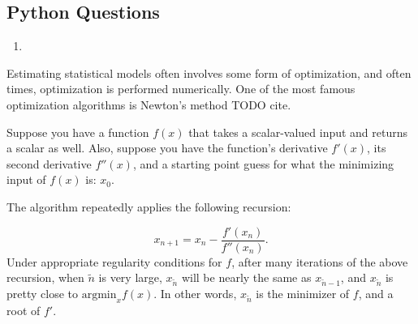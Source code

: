 \documentclass[
  12pt,
  krantz2]{krantz}
\providecommand{\tightlist}{%
  \setlength{\itemsep}{0pt}\setlength{\parskip}{0pt}}
\begin{document}
\hypertarget{python-questions-4}{%
\subsection{Python Questions}\label{python-questions-4}}

\begin{enumerate}
\def\labelenumi{\arabic{enumi}.}
\tightlist
\item
\end{enumerate}

Estimating statistical models often involves some form of optimization, and often times, optimization is performed numerically. One of the most famous optimization algorithms is Newton's method TODO cite.

Suppose you have a function \(f(x)\) that takes a scalar-valued input and returns a scalar as well. Also, suppose you have the function's derivative \(f'(x)\), its second derivative \(f''(x)\), and a starting point guess for what the minimizing input of \(f(x)\) is: \(x_0\).

The algorithm repeatedly applies the following recursion:

\[
x_{n+1} = x_{n} - \frac{f'(x_n)}{f''(x_{n})}.
\]
Under appropriate regularity conditions for \(f\), after many iterations of the above recursion, when \(\tilde{n}\) is very large, \(x_{\tilde{n}}\) will be nearly the same as \(x_{\tilde{n}-1}\), and \(x_{\tilde{n}}\) is pretty close to \(\text{argmin}_x f(x)\). In other words, \(x_{\tilde{n}}\) is the minimizer of \(f\), and a root of \(f'\).
\end{document}
